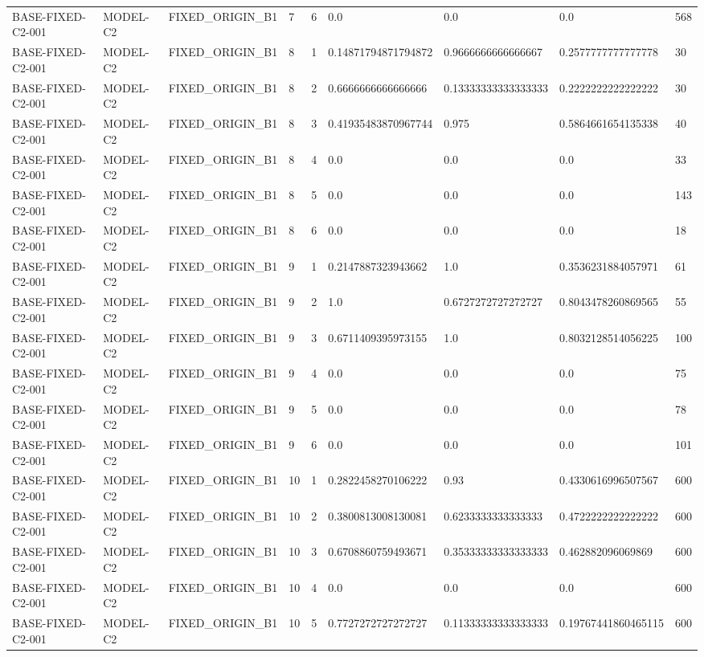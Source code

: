 \begin{tabular}{lllllllll}
BASE-FIXED-C2-001 & MODEL-C2 & FIXED\_ORIGIN\_B1 & 7 & 6 & 0.0 & 0.0 & 0.0 & 568 \\
BASE-FIXED-C2-001 & MODEL-C2 & FIXED\_ORIGIN\_B1 & 8 & 1 & 0.14871794871794872 & 0.9666666666666667 & 0.2577777777777778 & 30 \\
BASE-FIXED-C2-001 & MODEL-C2 & FIXED\_ORIGIN\_B1 & 8 & 2 & 0.6666666666666666 & 0.13333333333333333 & 0.2222222222222222 & 30 \\
BASE-FIXED-C2-001 & MODEL-C2 & FIXED\_ORIGIN\_B1 & 8 & 3 & 0.41935483870967744 & 0.975 & 0.5864661654135338 & 40 \\
BASE-FIXED-C2-001 & MODEL-C2 & FIXED\_ORIGIN\_B1 & 8 & 4 & 0.0 & 0.0 & 0.0 & 33 \\
BASE-FIXED-C2-001 & MODEL-C2 & FIXED\_ORIGIN\_B1 & 8 & 5 & 0.0 & 0.0 & 0.0 & 143 \\
BASE-FIXED-C2-001 & MODEL-C2 & FIXED\_ORIGIN\_B1 & 8 & 6 & 0.0 & 0.0 & 0.0 & 18 \\
BASE-FIXED-C2-001 & MODEL-C2 & FIXED\_ORIGIN\_B1 & 9 & 1 & 0.2147887323943662 & 1.0 & 0.3536231884057971 & 61 \\
BASE-FIXED-C2-001 & MODEL-C2 & FIXED\_ORIGIN\_B1 & 9 & 2 & 1.0 & 0.6727272727272727 & 0.8043478260869565 & 55 \\
BASE-FIXED-C2-001 & MODEL-C2 & FIXED\_ORIGIN\_B1 & 9 & 3 & 0.6711409395973155 & 1.0 & 0.8032128514056225 & 100 \\
BASE-FIXED-C2-001 & MODEL-C2 & FIXED\_ORIGIN\_B1 & 9 & 4 & 0.0 & 0.0 & 0.0 & 75 \\
BASE-FIXED-C2-001 & MODEL-C2 & FIXED\_ORIGIN\_B1 & 9 & 5 & 0.0 & 0.0 & 0.0 & 78 \\
BASE-FIXED-C2-001 & MODEL-C2 & FIXED\_ORIGIN\_B1 & 9 & 6 & 0.0 & 0.0 & 0.0 & 101 \\
BASE-FIXED-C2-001 & MODEL-C2 & FIXED\_ORIGIN\_B1 & 10 & 1 & 0.2822458270106222 & 0.93 & 0.4330616996507567 & 600 \\
BASE-FIXED-C2-001 & MODEL-C2 & FIXED\_ORIGIN\_B1 & 10 & 2 & 0.3800813008130081 & 0.6233333333333333 & 0.4722222222222222 & 600 \\
BASE-FIXED-C2-001 & MODEL-C2 & FIXED\_ORIGIN\_B1 & 10 & 3 & 0.6708860759493671 & 0.35333333333333333 & 0.462882096069869 & 600 \\
BASE-FIXED-C2-001 & MODEL-C2 & FIXED\_ORIGIN\_B1 & 10 & 4 & 0.0 & 0.0 & 0.0 & 600 \\
BASE-FIXED-C2-001 & MODEL-C2 & FIXED\_ORIGIN\_B1 & 10 & 5 & 0.7727272727272727 & 0.11333333333333333 & 0.19767441860465115 & 600 \\

\end{tabular}
